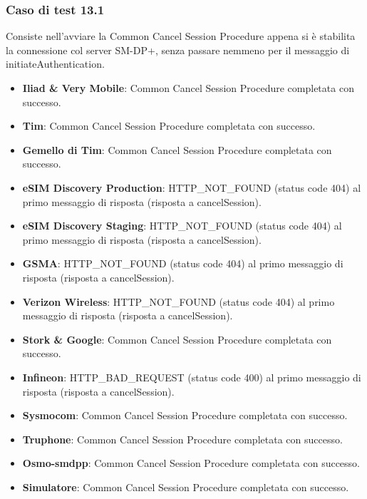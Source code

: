 \documentclass[10pt, oneside]{book}
\begin{document}
\subsubsection{Caso di test 13.1}
Consiste nell'avviare la Common Cancel Session Procedure appena si è stabilita la connessione col server SM-DP+, senza passare nemmeno per il messaggio di initiateAuthentication.
\begin{itemize}
\item \textbf{Iliad \& Very Mobile}: Common Cancel Session Procedure completata con successo.
\item \textbf{Tim}: Common Cancel Session Procedure completata con successo.
\item \textbf{Gemello di Tim}: Common Cancel Session Procedure completata con successo.
\item \textbf{eSIM Discovery Production}: HTTP\_NOT\_FOUND (status code 404) al primo messaggio di risposta (risposta a cancelSession).
\item \textbf{eSIM Discovery Staging}: HTTP\_NOT\_FOUND (status code 404) al primo messaggio di risposta (risposta a cancelSession).
\item \textbf{GSMA}: HTTP\_NOT\_FOUND (status code 404) al primo messaggio di risposta (risposta a cancelSession).
\item \textbf{Verizon Wireless}: HTTP\_NOT\_FOUND (status code 404) al primo messaggio di risposta (risposta a cancelSession).
\item \textbf{Stork \& Google}: Common Cancel Session Procedure completata con successo.
\item \textbf{Infineon}: HTTP\_BAD\_REQUEST (status code 400) al primo messaggio di risposta (risposta a cancelSession).
\item \textbf{Sysmocom}: Common Cancel Session Procedure completata con successo.
\item \textbf{Truphone}: Common Cancel Session Procedure completata con successo.
\item \textbf{Osmo-smdpp}: Common Cancel Session Procedure completata con successo.
\item \textbf{Simulatore}: Common Cancel Session Procedure completata con successo.
\end{itemize}
\end{document}
